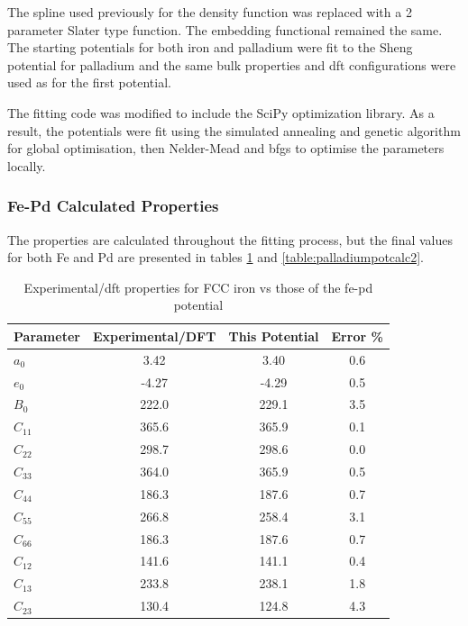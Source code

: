 The spline used previously for the density function was replaced with a 2 parameter Slater type function.  The embedding functional remained the same.  The starting potentials for both iron and palladium were fit to the Sheng potential for palladium and the same bulk properties and \acrshort{dft} configurations were used as for the first potential.

The fitting code was modified to include the SciPy optimization library.  As a result, the potentials were fit using the simulated annealing and genetic algorithm for global optimisation, then Nelder-Mead and \acrlong{bfgs} to optimise the parameters locally.




\FloatBarrier
\subsubsection{Fe-Pd Calculated Properties}

The properties are calculated throughout the fitting process, but the final values for both Fe and Pd are presented in tables \ref{table:ironpotcalc2} and \ref{table:palladiumpotcalc2}.

\begin{table}[ht]
\renewcommand{\arraystretch}{1.2}
\begin{tabular}{lccc}
\hline\hline
Parameter & Experimental/DFT & This Potential & Error \%\\
\hline\hline
$a_0$ & 3.42   &  3.40 & 0.6 \\
$e_0$ & -4.27  & -4.29 & 0.5 \\
$B_0$ & 222.0  &  229.1 & 3.5 \\
$C_{11}$ & 365.6  &  365.9 & 0.1\\
$C_{22}$ & 298.7  &  298.6 & 0.0 \\
$C_{33}$ & 364.0  &  365.9 & 0.5\\
$C_{44}$ & 186.3  &  187.6 & 0.7 \\
$C_{55}$ & 266.8  &  258.4 & 3.1 \\
$C_{66}$ & 186.3  &  187.6 & 0.7 \\
$C_{12}$ & 141.6  &  141.1 & 0.4 \\
$C_{13}$ & 233.8  &  238.1 & 1.8 \\
$C_{23}$ & 130.4  &  124.8 & 4.3 \\
\hline\hline
\end{tabular}
\caption{Experimental/dft properties for FCC iron vs those of the fe-pd potential}
\label{table:ironpotcalc2}
\end{table}


